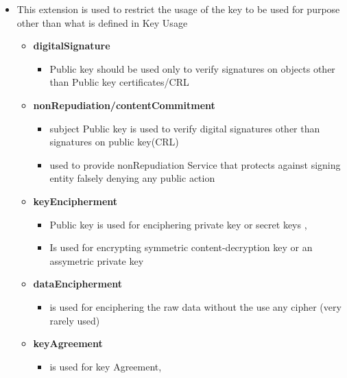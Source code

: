 \documentclass[a4paper]{article}
\begin{document}
\begin{itemize}
\begin{itemize}
                    \item This extension is used to restrict the usage of the key to be used for purpose 
                        other than what is defined in Key Usage
                    \begin{itemize}
                        \item \textbf{digitalSignature}
                            \begin{itemize}
                                \item Public key should be used only to verify signatures on objects other than Public key certificates/CRL
                            \end{itemize}
                        \item \textbf{nonRepudiation/contentCommitment}
                            \begin{itemize}
                                \item subject Public key is used to verify digital signatures other than signatures on public key(CRL)
                                \item used to provide nonRepudiation Service that protects against signing entity falsely denying any public action
                            \end{itemize}
                        \item \textbf{keyEncipherment}
                            \begin{itemize}
                                \item Public key is used for enciphering private key or secret keys , 
                                \item Is used for encrypting symmetric content-decryption key or an assymetric private key
                            \end{itemize}
                        \item \textbf{dataEncipherment}
                            \begin{itemize}
                                \item is used for enciphering the raw data without the use any cipher  (very rarely used)
                            \end{itemize}
                        \item \textbf{keyAgreement}
                            \begin{itemize}
                                \item is used for key Agreement, 

\end{itemize}
\end{itemize}
\end{itemize}
\end{itemize}
\end{document}
